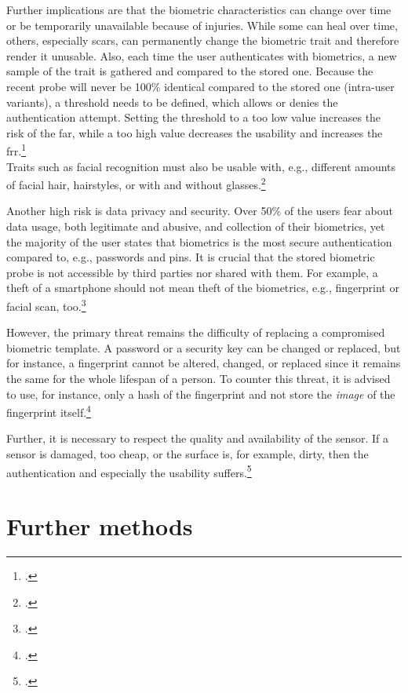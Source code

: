 Further implications are that the biometric characteristics can change over time or be temporarily unavailable because of injuries. While some can heal over time, others, especially scars, can permanently change the biometric trait and therefore render it unusable. Also, each time the user authenticates with biometrics, a new sample of the trait is gathered and compared to the stored one. Because the recent probe will never be 100\% identical compared to the stored one (\frqq intra-user variants\flqq), a threshold needs to be defined, which allows or denies the authentication attempt. Setting the threshold to a too low value increases the risk of the \gls{far}, while a too high value decreases the usability and increases the \gls{frr}.\footcite[See][13--17, 52]{Jain2011}\\Traits such as facial recognition must also be usable with, e.g., different amounts of facial hair, hairstyles, or with and without glasses.\footcite[See][98]{Jain2011}

Another high risk is data privacy and security. Over 50\% of the users fear about data usage, both legitimate and abusive, and collection of their biometrics, yet the majority of the user states that biometrics is the most secure authentication compared to, e.g., passwords and \glspl{pin}. It is crucial that the stored biometric probe is not accessible by third parties nor shared with them. For example, a theft of a smartphone should not mean theft of the biometrics, e.g., fingerprint or facial scan, too.\footcites[See][8]{ibm-security}

However, the primary threat remains the difficulty of replacing a compromised biometric template. A password or a security key can be changed or replaced, but for instance, a fingerprint cannot be altered, changed, or replaced since it remains the same for the whole lifespan of a person. To counter this threat, it is advised to use, for instance, only a hash of the fingerprint and not store the \textit{image} of the fingerprint itself.\footcites[See][266]{shostack2014threat}

Further, it is necessary to respect the quality and availability of the sensor. If a sensor is damaged, too cheap, or the surface is, for example, dirty, then the authentication and especially the usability suffers.\footcites[See][37]{265831}

\section{Further methods}

